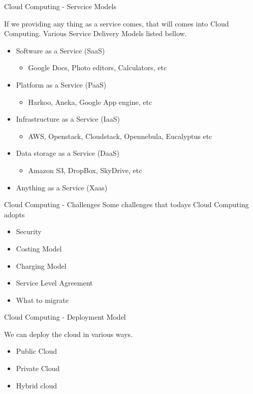 \documentclass[xcolor=dvipsnames]{beamer}
\begin{document}
\begin{frame}{Cloud Computing - Servcice Models }

If we providing any thing as a service comes, that will comes into Cloud Computing. Various Service Delivery Models listed bellow.

\begin{itemize}
\item Software as a Service (SaaS) 
\begin{itemize}
	\item Google Docs, Photo editors, Calculators, etc
\end{itemize}
\item Platform as a Service (PaaS)
\begin{itemize}
	\item Harkoo, Aneka, Google App engine, etc
\end{itemize}
\item Infrastructure as a Service (IaaS)
\begin{itemize}
	\item AWS, Openstack, Cloudstack, Opennebula, Eucalyptus etc
\end{itemize}
\item Data storage as a Service (DaaS)
\begin{itemize}
	\item Amazon S3, DropBox, SkyDrive, etc
\end{itemize}
\item Anything as a Service (Xaas)
\end{itemize}
\end{frame}

\begin{frame}{Cloud Computing - Challenges}
Some challenges that todays Cloud Computing adopts

\begin{itemize}
\item Security
\item Costing Model
\item Charging Model
\item Service Level Agreement
\item What to migrate
\end{itemize}
\end{frame}

\begin{frame}{Cloud Computing - Deployment Model }

We can deploy the cloud in various ways.

\begin{itemize}
\item Public Cloud
\item Private Cloud
\item Hybrid cloud
\end{itemize}

\end{frame}
\end{document}
